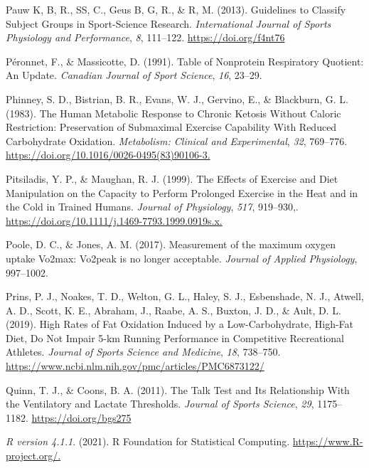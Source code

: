 \documentclass[]{cik}%
\newlength{\cslhangindent}
\newlength{\cslentryspacingunit} %
\newenvironment{CSLReferences}[2] %
 {%
  \setlength{\parindent}{0pt}
  \ifodd #1
  \let\oldpar\par
  \def\par{\hangindent=\cslhangindent\oldpar}
  \fi
  \setlength{\parskip}{#2\cslentryspacingunit}
 }%
 {}
\begin{document}
\begin{CSLReferences}{1}{0}
\leavevmode{}%
Pauw K, B, R., SS, C., Geus B, G, R., \& R, M. (2013). Guidelines to
Classify Subject Groups in Sport-Science Research. \emph{International
Journal of Sports Physiology and Performance}, \emph{8}, 111--122.
\url{https://doi.org/f4nt76}

\leavevmode{}%
Péronnet, F., \& Massicotte, D. (1991). Table of Nonprotein Respiratory
Quotient: An Update. \emph{Canadian Journal of Sport Science},
\emph{16}, 23--29.

\leavevmode{}%
Phinney, S. D., Bistrian, B. R., Evans, W. J., Gervino, E., \&
Blackburn, G. L. (1983). The Human Metabolic Response to Chronic Ketosis
Without Caloric Restriction: Preservation of Submaximal Exercise
Capability With Reduced Carbohydrate Oxidation. \emph{Metabolism:
Clinical and Experimental}, \emph{32}, 769--776.
\url{https://doi.org/10.1016/0026-0495(83)90106-3.}

\leavevmode{}%
Pitsiladis, Y. P., \& Maughan, R. J. (1999). The Effects of Exercise and
Diet Manipulation on the Capacity to Perform Prolonged Exercise in the
Heat and in the Cold in Trained Humans. \emph{Journal of Physiology},
\emph{517}, 919--930,.
\url{https://doi.org/10.1111/j.1469-7793.1999.0919s.x.}

\leavevmode{}%
Poole, D. C., \& Jones, A. M. (2017). Measurement of the maximum oxygen
uptake Vo2max: Vo2peak is no longer acceptable. \emph{Journal of Applied
Physiology}, 997--1002.

\leavevmode{}%
Prins, P. J., Noakes, T. D., Welton, G. L., Haley, S. J., Esbenshade, N.
J., Atwell, A. D., Scott, K. E., Abraham, J., Raabe, A. S., Buxton, J.
D., \& Ault, D. L. (2019). High Rates of Fat Oxidation Induced by a
Low-Carbohydrate, High-Fat Diet, Do Not Impair 5-km Running Performance
in Competitive Recreational Athletes. \emph{Journal of Sports Science
and Medicine}, \emph{18}, 738--750.
\url{https://www.ncbi.nlm.nih.gov/pmc/articles/PMC6873122/}

\leavevmode{}%
Quinn, T. J., \& Coons, B. A. (2011). The Talk Test and Its Relationship
With the Ventilatory and Lactate Thresholds. \emph{Journal of Sports
Science}, \emph{29}, 1175--1182. \url{https://doi.org/bgs275}

\leavevmode{}%
\emph{R version 4.1.1}. (2021). R Foundation for Statistical Computing.
\url{https://www.R-project.org/.}


\end{CSLReferences}
\end{document}
